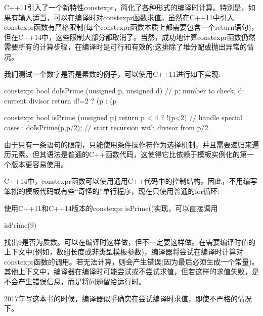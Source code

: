 C++11引入了一个新特性constexpr，简化了各种形式的编译时计算。特别是，如果有输入适当，可以在编译时对constexpr函数求值。虽然在C++11中引入constexpr函数有严格限制(每个constexpr函数本质上都需要包含一个return语句)，但在C++14中，这些限制大部分都取消了。当然，成功地计算constexpr函数仍然需要所有的计算步骤，在编译时是可行和有效的:这排除了堆分配或抛出异常的情况。

我们测试一个数字是否是素数的例子，可以使用C++11进行如下实现:

\begin{cpp}
constexpr bool
doIsPrime (unsigned p, unsigned d) // p: number to check, d: current divisor
{
	return d!=2 ? (p%
	: (p%
}

constexpr bool isPrime (unsigned p)
{
	return p < 4 ? !(p<2) // handle special cases
	: doIsPrime(p,p/2); // start recursion with divisor from p/2
}
\end{cpp}

由于只有一条语句的限制，只能使用条件操作符作为选择机制，并且需要递归来遍历元素。但其语法是普通的C++函数代码，这使得它比依赖于模板实例化的第一个版本更容易使用。

C++14中，constexpr函数可以使用通用C++代码中的控制结构。因此，不用编写笨拙的模板代码或有些“奇怪的”单行程序，现在只使用普通的for循环:


使用C++11和C++14版本的constexpr isPrime()实现，可以直接调用

\begin{cpp}
isPrime(9)
\end{cpp}

找出9是否为质数。可以在编译时这样做，但不一定要这样做。在需要编译时值的上下文中(例如，数组长度或非类型模板参数)，编译器将尝试在编译时计算对constexpr函数的调用。若无法计算，则会产生错误(因为最后必须生成一个常量)。其他上下文中，编译器在编译时可能尝试或不尝试求值，但若这样的求值失败，是不会产生错误信息，而是将问题留给运行时。

\begin{notice}2017年写这本书的时候，编译器似乎确实在尝试编译时求值，即使不严格的情况下。
\end{notice}

